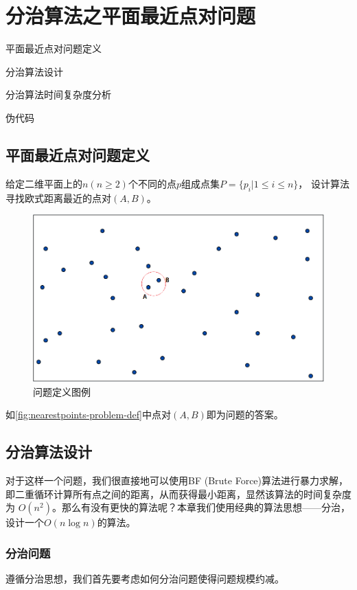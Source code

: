 \chapter{分治算法之平面最近点对问题}

\begin{introduction}
	\item 平面最近点对问题定义
	\item 分治算法设计
	\item 分治算法时间复杂度分析
	\item 伪代码
\end{introduction}

\section{平面最近点对问题定义}
给定二维平面上的$n(n \ge 2)$个不同的点$p$组成点集$P = \{p_i \big| 1\le i \le n\}$，
设计算法寻找欧式距离最近的点对$(A,B)$。
\begin{figure}[htb]
	\centering
	\includegraphics[scale=0.5]{image/NearestPointsDef.png}
  \caption{问题定义图例}\label{fig:nearestpoints-problem-def}
\end{figure}

如\autoref{fig:nearestpoints-problem-def}中点对$(A,B)$即为问题的答案。

\section{分治算法设计}
对于这样一个问题，我们很直接地可以使用BF (Brute Force)算法进行暴力求解，
即二重循环计算所有点之间的距离，从而获得最小距离，显然该算法的时间复杂度为
$O(n^2)$。那么有没有更快的算法呢？本章我们使用经典的算法思想——分治，
设计一个$O(n\log n)$的算法。

\subsection{分治问题}
遵循分治思想，我们首先要考虑如何分治问题使得问题规模约减。

